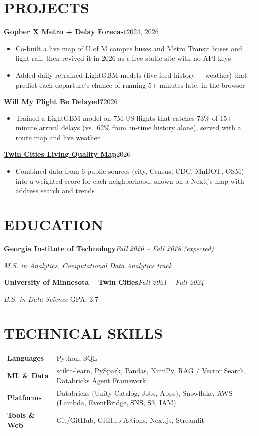 \documentclass[paper=letter,fontsize=10.5pt]{scrartcl}
\newcommand{\NewPart}[1]{\section*{\uppercase{#1}}}
\newcommand{\Org}[2]{\textbf{#1}\hfill\textit{#2}\par}
\newcommand{\Project}[3]{\textbf{\href{#2}{#1}}\hfill #3\par}
\begin{document}
\NewPart{Projects}

\Project{Gopher X Metro + Delay Forecast}{https://gopher-x-metro.github.io/}{2024, 2026}
\begin{itemize}
  \item Co-built a live map of U of M campus buses and Metro Transit buses and light rail, then revived it in 2026 as a free static site with no API keys
  \item Added daily-retrained LightGBM models (live-feed history + weather) that predict each departure's chance of running 5+ minutes late, in the browser
\end{itemize}
\vspace{3pt}
\Project{Will My Flight Be Delayed?}{https://kennedyjohnson.github.io/will-my-flight-be-delayed/}{2026}
\begin{itemize}
  \item Trained a LightGBM model on 7M US flights that catches 73\% of 15+ minute arrival delays (vs.\ 62\% from on-time history alone), served with a route map and live weather
\end{itemize}
\vspace{3pt}
\Project{Twin Cities Living Quality Map}{https://twin-cities-living-quality-map.ken-j.workers.dev/}{2026}
\begin{itemize}
  \item Combined data from 6 public sources (city, Census, CDC, MnDOT, OSM) into a weighted score for each neighborhood, shown on a Next.js map with address search and trends
\end{itemize}

\NewPart{Education}

\Org{Georgia Institute of Technology}{Fall 2026 -- Fall 2028 (expected)}
\textit{M.S. in Analytics, Computational Data Analytics track}\par
\vspace{3pt}
\Org{University of Minnesota -- Twin Cities}{Fall 2021 -- Fall 2024}
\textit{B.S. in Data Science} \hfill GPA: 3.7\par

\NewPart{Technical Skills}

\begin{tabular}{@{}l l@{}}
  \textbf{Languages}    & Python, SQL \\
  \textbf{ML \& Data}   & scikit-learn, PySpark, Pandas, NumPy, RAG / Vector Search, Databricks Agent Framework \\
  \textbf{Platforms}    & Databricks (Unity Catalog, Jobs, Apps), Snowflake, AWS (Lambda, EventBridge, SNS, S3, IAM) \\
  \textbf{Tools \& Web} & Git/GitHub, GitHub Actions, Next.js, Streamlit \\
\end{tabular}
\end{document}
